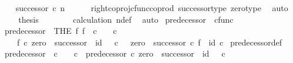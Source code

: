 \begin{isabellebody}
\ \isamarkupfalse%
\ {\isachardoublequoteopen}{\isachardot}{\kern0pt}{\isachardot}{\kern0pt}{\isachardot}{\kern0pt}\ {\isacharequal}{\kern0pt}\ successor\ {\isasymcirc}\isactrlsub c\ n{\isachardoublequoteclose}\isanewline
\ \ \ \ \isamarkupfalse%
\ right{\isacharunderscore}{\kern0pt}coproj{\isacharunderscore}{\kern0pt}cfunc{\isacharunderscore}{\kern0pt}coprod\ successor{\isacharunderscore}{\kern0pt}type\ zero{\isacharunderscore}{\kern0pt}type\ \isamarkupfalse%
\ auto\isanewline
\ \ \isamarkupfalse%
\ \isamarkupfalse%
\ {\isacharquery}{\kern0pt}thesis\isanewline
\ \ \ \ \isamarkupfalse%
\ \ \ calculation\ n{\isacharunderscore}{\kern0pt}def\ \isamarkupfalse%
\ auto\isanewline
{}\isamarkupfalse%
%
\endisatagproof
{\isafoldproof}%
%
\isadelimproof
%
\endisadelimproof
%
\isadelimdocument
%
\endisadelimdocument
%
\isatagdocument
%
\isamarkuptrue%
%
\endisatagdocument
{\isafolddocument}%
%
\isadelimdocument
%
\endisadelimdocument
{}\isamarkupfalse%
\ predecessor\ {\isacharcolon}{\kern0pt}{\isacharcolon}{\kern0pt}\ {\isachardoublequoteopen}cfunc{\isachardoublequoteclose}\ \isanewline
\ \ {\isachardoublequoteopen}predecessor\ {\isacharequal}{\kern0pt}\ {\isacharparenleft}{\kern0pt}THE\ f{\isachardot}{\kern0pt}\ f\ {\isacharcolon}{\kern0pt}\ {\isasymnat}\isactrlsub c\ {\isasymrightarrow}\ {\isasymone}\ {\isasymCoprod}\ {\isasymnat}\isactrlsub c\ \isanewline
\ \ \ \ {\isasymand}\ f\ {\isasymcirc}\isactrlsub c\ {\isacharparenleft}{\kern0pt}zero\ {\isasymamalg}\ successor{\isacharparenright}{\kern0pt}\ {\isacharequal}{\kern0pt}\ id\ {\isacharparenleft}{\kern0pt}{\isasymone}\ {\isasymCoprod}\ {\isasymnat}\isactrlsub c{\isacharparenright}{\kern0pt}\ {\isasymand}\ \ {\isacharparenleft}{\kern0pt}zero\ {\isasymamalg}\ successor{\isacharparenright}{\kern0pt}\ {\isasymcirc}\isactrlsub c\ f\ {\isacharequal}{\kern0pt}\ id\ {\isasymnat}\isactrlsub c{\isacharparenright}{\kern0pt}{\isachardoublequoteclose}\isanewline
\isanewline
{}\isamarkupfalse%
\ predecessor{\isacharunderscore}{\kern0pt}def{}{\isacharcolon}{\kern0pt}\isanewline
\ \ {\isachardoublequoteopen}predecessor\ {\isacharcolon}{\kern0pt}\ {\isasymnat}\isactrlsub c\ {\isasymrightarrow}\ {\isasymone}\ {\isasymCoprod}\ {\isasymnat}\isactrlsub c\ {\isasymand}\ predecessor\ {\isasymcirc}\isactrlsub c\ {\isacharparenleft}{\kern0pt}zero\ {\isasymamalg}\ successor{\isacharparenright}{\kern0pt}\ {\isacharequal}{\kern0pt}\ id\ {\isacharparenleft}{\kern0pt}{\isasymone}\ {\isasymCoprod}\ {\isasymnat}\isactrlsub c{\isacharparenright}{\kern0pt}\isanewline

\end{isabellebody}
